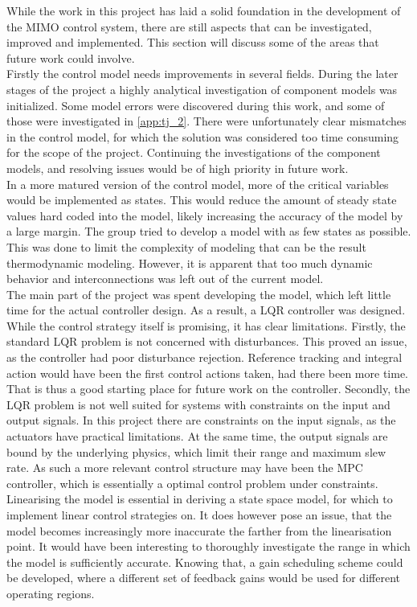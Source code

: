 While the work in this project has laid a solid foundation in the development of the MIMO control system, there are still aspects that can be investigated, improved and implemented. This section will discuss some of the areas that future work could involve.\\

Firstly the control model needs improvements in several fields. During the later stages of the project a highly analytical investigation of component models was initialized. Some model errors were discovered during this work, and some of those were investigated in \cref{app:tj_2}. There were unfortunately clear mismatches in the control model, for which the solution was considered too time consuming for the scope of the project. Continuing the investigations of the component models, and resolving issues would be of high priority in future work. \\

In a more matured version of the control model, more of the critical variables would be implemented as states. This would reduce the amount of steady state values hard coded into the model, likely increasing the accuracy of the model by a large margin. The group tried to develop a model with as few states as possible. This was done to limit the complexity of  modeling that can be the result thermodynamic modeling. However, it is apparent that too much dynamic behavior and interconnections was left out of the current model.\\

The main part of the project was spent developing the model, which left little time for the actual controller design. As a result, a LQR controller was designed. While the control strategy itself is promising, it has clear limitations. Firstly, the standard LQR problem is not concerned with disturbances. This proved an issue, as the controller had poor disturbance rejection. Reference tracking and integral action would have been the first control actions taken, had there been more time. That is thus a good starting place for future work on the controller. Secondly, the LQR problem is not well suited for systems with constraints on the input and output signals. In this project there are constraints on the input signals, as the actuators have practical limitations. At the same time, the output signals are bound by the underlying physics, which limit their range and maximum slew rate. As such a more relevant control structure may have been the MPC controller, which is essentially a optimal control problem under constraints.\\

Linearising the model is essential in deriving a state space model, for which to implement linear control strategies on. It does however pose an issue, that the model becomes increasingly more inaccurate the farther from the linearisation point. It would have been interesting to thoroughly investigate the range in which the model is sufficiently accurate. Knowing that, a gain scheduling scheme could be developed, where a different set of feedback gains would be used for different operating regions. 